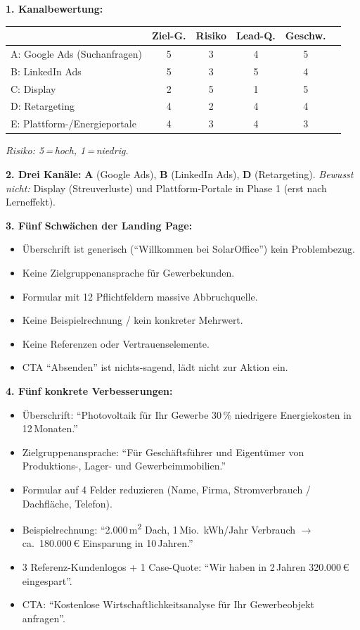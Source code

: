 \documentclass[11pt,a4paper,oneside]{article}
\begin{document}
\begin{loesungbox}
\textbf{1. Kanalbewertung:}

\smallskip
\begin{tabularx}{\linewidth}{@{}lccccc@{}}
\toprule
& \textbf{Ziel-G.} & \textbf{Risiko} & \textbf{Lead-Q.} & \textbf{Geschw.} \\
\midrule
A: Google Ads (Suchanfragen)    & 5 & 3 & 4 & 5 \\
B: LinkedIn Ads                  & 5 & 3 & 5 & 4 \\
C: Display                       & 2 & 5 & 1 & 5 \\
D: Retargeting                   & 4 & 2 & 4 & 4 \\
E: Plattform-/Energieportale    & 4 & 3 & 4 & 3 \\
\bottomrule
\end{tabularx}

\smallskip
\emph{Risiko: 5\,=\,hoch, 1\,=\,niedrig.}

\textbf{2. Drei Kanäle:} \textbf{A} (Google Ads), \textbf{B} (LinkedIn Ads), \textbf{D} (Retargeting). \emph{Bewusst nicht:} Display (Streuverluste) und Plattform-Portale in Phase 1 (erst nach Lerneffekt).

\textbf{3. Fünf Schwächen der Landing Page:}
\begin{itemize}
  \item Überschrift ist generisch (``Willkommen bei SolarOffice'') \textendash{} kein Problembezug.
  \item Keine Zielgruppenansprache für Gewerbekunden.
  \item Formular mit 12 Pflichtfeldern \textendash{} massive Abbruchquelle.
  \item Keine Beispielrechnung / kein konkreter Mehrwert.
  \item Keine Referenzen oder Vertrauenselemente.
  \item CTA ``Absenden'' ist nichts-sagend, lädt nicht zur Aktion ein.
\end{itemize}

\textbf{4. Fünf konkrete Verbesserungen:}
\begin{itemize}
  \item Überschrift: ``Photovoltaik für Ihr Gewerbe \textendash{} 30\,\% niedrigere Energiekosten in 12\,Monaten.''
  \item Zielgruppenansprache: ``Für Geschäftsführer und Eigentümer von Produktions-, Lager- und Gewerbeimmobilien.''
  \item Formular auf 4 Felder reduzieren (Name, Firma, Stromverbrauch / Dachfläche, Telefon).
  \item Beispielrechnung: ``2.000\,m\textsuperscript{2} Dach, 1\,Mio.\ kWh/Jahr Verbrauch $\rightarrow$ ca.\ 180.000\,\euro{} Einsparung in 10\,Jahren.''
  \item 3 Referenz-Kundenlogos + 1 Case-Quote: ``Wir haben in 2\,Jahren 320.000\,\euro{} eingespart''.
  \item CTA: ``Kostenlose Wirtschaftlichkeitsanalyse für Ihr Gewerbeobjekt anfragen''.
\end{itemize}


\end{loesungbox}
\end{document}
